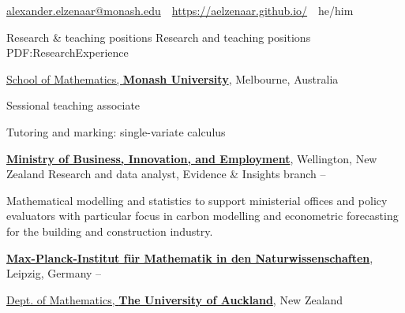 \documentclass[a4paper,yyyy,nonstopmode,10pt]{simpleresumecv}
\newcommand{\CVAuthor}{Alexander Elzenaar}
\newcommand{\CVWebpage}{https://aelzenaar.github.io/}
\begin{document}

\Title{\CVAuthor}

\begin{SubTitle}
\href{mailto:alexander.elzenaar@monash.edu}
{alexander.elzenaar@monash.edu}
\,\SubBulletSymbol\,
\href{\CVWebpage}
{\url{\CVWebpage}}
\,\SubBulletSymbol\,
he/him
\end{SubTitle}

\begin{Body}



\Section
{Research \& teaching positions}
{Research and teaching positions}
{PDF:ResearchExperience}

\Entry
\href{https://www.monash.edu/science/schools/school-of-mathematics}
{School of Mathematics, \textbf{Monash University}}, Melbourne,
Australia

\Gap
\BulletItem
Sessional teaching associate
\hfill
{}
\begin{Detail}
\SubBulletItem
Tutoring and marking: single-variate calculus
\end{Detail}

\Entry
\href{https://mbie.govt.nz/}
{\textbf{Ministry of Business, Innovation, and Employment}},
Wellington, New Zealand
\Gap
\BulletItem
Research and data analyst, Evidence \& Insights branch
\hfill
{}--
\begin{Detail}
\SubBulletItem
Mathematical modelling and statistics to support ministerial offices and policy evaluators
with particular focus in carbon modelling and econometric forecasting for the building and construction industry.
\end{Detail}

\Entry
\href{https://www.mis.mpg.de/institute.html}
{\textbf{Max-Planck-Institut für Mathematik in den Naturwissenschaften}}, Leipzig, Germany
\hfill{}--

\Entry
\href{http://www.auckland.ac.nz/}
{Dept. of Mathematics, \textbf{The University of Auckland}},
New Zealand


\end{Body}
\end{document}
